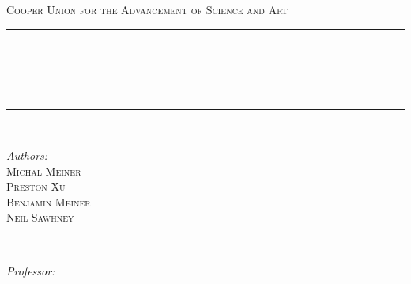 \begin{titlepage}
	\newcommand{\HRule}{\rule{\linewidth}{0.5mm}}
	\center
	\textsc{\LARGE Cooper Union for the Advancement of Science and
		Art}\\[1.5cm]
	{\color{teal} \HRule\\[0.4cm]}
	{\huge\bfseries \titleName\\[0.5cm] \textmd{\LARGE \courseName}}\\[0.4cm]
	{\color{teal} \HRule\\[0.4cm]}
	\begin{minipage}{0.4\textwidth}
		\begin{flushleft}
			\large
			\textit{Authors:}\\
			\textsc{Michal Meiner} \\
			\textsc{Preston Xu} \\
			\textsc{Benjamin Meiner} \\
			\textsc{Neil Sawhney} \\
		\end{flushleft}
	\end{minipage}
	~
	\begin{minipage}{0.4\textwidth}
		\begin{flushright}
			\large
			\textit{Professor:}\\
			\textsc{\professorName}

		\end{flushright}
	\end{minipage}
	\vfill\vfill\vfill
	{\large\dateCreated}
	\vfill

	\newpage
	\tableofcontents
\end{titlepage}

\title{\titleName}